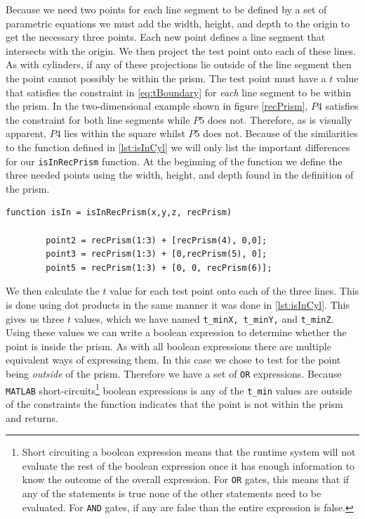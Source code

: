 \documentclass[authoryearcitations]{UoYCSproject}
\begin{document}
Because we need two points for each line segment to be defined by a set of parametric equations we must add the
width, height, and depth to the origin to get the necessary three points. Each new point defines a line segment 
that intersects with the origin. We then project the test point onto each of these lines. As with cylinders,
if any of these projections lie outside of the line segment then the point cannot possibly be within the prism. 
The test point must have a $t$ value that satisfies the constraint in \ref{eq:tBoundary} for \emph{each} line segment
to be within the prism. In the two-dimensional example shown in figure \ref{recPrism}, $P4$ satisfies the constraint
for both line segments while $P5$ does not. Therefore, as is visually apparent, $P4$ lies within the square whilst 
$P5$ does not. Because of the similarities to the function defined in \ref{lst:isInCyl} we will only list the
important differences for our \verb+isInRecPrism+ function. At the beginning of the function we define the three needed
points using the width, height, and depth found in the definition of the prism. 

\begin{lstlisting}[caption={Implementation of finding points that lie within a rectangular prism}, label=lst:isInPrism]
function isIn = isInRecPrism(x,y,z, recPrism)
    
        point2 = recPrism(1:3) + [recPrism(4), 0,0];
        point3 = recPrism(1:3) + [0,recPrism(5), 0];
        point5 = recPrism(1:3) + [0, 0, recPrism(6)];
\end{lstlisting}

We then calculate the $t$ value for each test point onto each of the three lines. This is done using dot products
in the same manner it was done in \ref{lst:isInCyl}. This gives us three $t$ values, which we have named
\verb+t_minX, t_minY,+ and \verb+t_minZ+. Using these values we can write a boolean expression to determine
whether the point is inside the prism. As with all boolean expressions there are multiple equivalent ways
of expressing them. In this case we chose to test for the point being \emph{outside} of the prism. Therefore
we have a set of \verb+OR+ expressions. Because \verb+MATLAB+ short-circuits\footnote{Short circuiting a boolean 
expression means that the runtime system will not evaluate the rest of the boolean expression once it has enough
information to know the outcome of the overall expression. For \texttt{OR} gates, this means that if any of the
statements is true none of the other statements need to be evaluated. For \texttt{AND} gates, if any are false
than the entire expression is false.} boolean expressions is any of the \verb+t_min+ values are outside of the
constraints the function indicates that the point is not within the prism and returns. 
\end{document}
